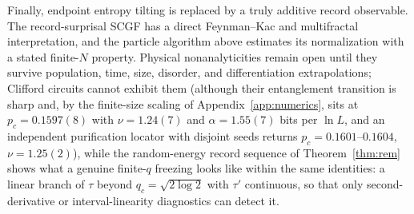\documentclass[aps,prx,reprint,superscriptaddress,nobibnotes,longbibliography]{revtex4-2}
\theoremstyle{remark}
\begin{document}
Finally, endpoint entropy tilting is replaced by a truly additive record observable.  The record-surprisal SCGF has a direct Feynman--Kac and multifractal interpretation, and the particle algorithm above estimates its normalization with a stated finite-$N$ property.  Physical nonanalyticities remain open until they survive population, time, size, disorder, and differentiation extrapolations; Clifford circuits cannot exhibit them (although their entanglement transition is sharp and, by the finite-size scaling of Appendix~\ref{app:numerics}, sits at $p_c=0.1597(8)$ with $\nu=1.24(7)$ and $\alpha=1.55(7)$ bits per $\ln L$, and an independent purification locator with disjoint seeds returns $p_c=0.1601$--$0.1604$, $\nu=1.25(2)$), while the random-energy record sequence of Theorem~\ref{thm:rem} shows what a genuine finite-$q$ freezing looks like within the same identities: a linear branch of $\tau$ beyond $q_c=\sqrt{2\log2}$ with $\tau'$ continuous, so that only second-derivative or interval-linearity diagnostics can detect it.
\end{document}
